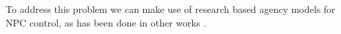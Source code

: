 To address this problem we can make use of research based agency models for NPC control, as has been done in other works \cite{guimaraes:cif-ck-17}\cite{ferreira:merchant-model}\cite{evans:versu}\cite{mccoy:prom-week}\cite{sullivan:mismanor}\cite{mateas:facade}.







